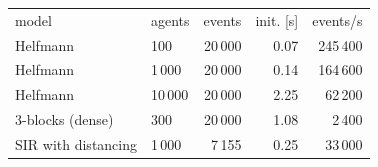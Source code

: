 \begin{ruledtabular}
\begin{tabular}{llrrr}
model & agents & events & init. [s] & events/s \\
\colrule
Helfmann & 100 & 20\,000 & 0.07 & 245\,400 \\
Helfmann & 1\,000 & 20\,000 & 0.14 & 164\,600 \\
Helfmann & 10\,000 & 20\,000 & 2.25 & 62\,200 \\
3-blocks (dense) & 300 & 20\,000 & 1.08 & 2\,400 \\
SIR with distancing & 1\,000 & 7\,155 & 0.25 & 33\,000 \\
\end{tabular}
\end{ruledtabular}
